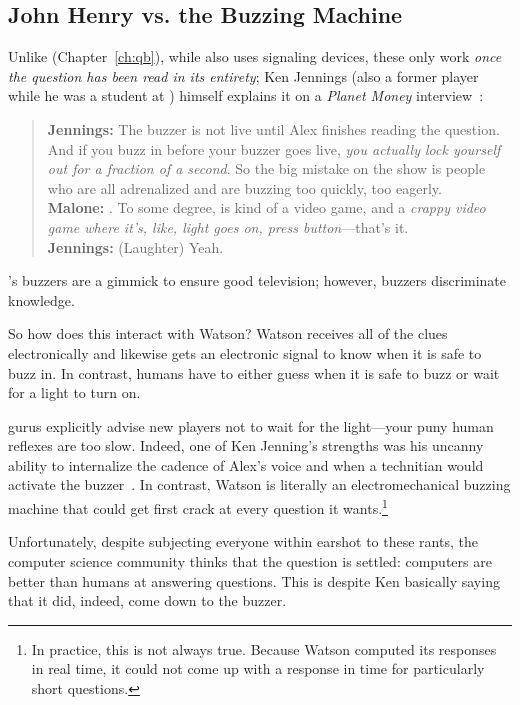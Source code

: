 \subsection{John Henry vs. the Buzzing Machine}

Unlike \qb{} (Chapter~\ref{ch:qb}), while \jeopardy{} also uses
signaling devices, these only work \emph{once the question has been
  read in its entirety}; Ken Jennings (also a former \qb{} player while he was a student at
) himself explains it on a \textit{Planet Money}
interview~\citep{malone-19}:
\begin{quote}
{\bf Jennings:} The buzzer is
    not live until Alex finishes reading the question. And if you buzz
    in before your buzzer goes live, \emph{you actually lock yourself out
    for a fraction of a second}. So the big mistake on the show is
    people who are all adrenalized and are buzzing too quickly, too
    eagerly. \\
{\bf Malone:} . To some degree, \jeopardy{} is kind of a video game, and a \emph{crappy video game where it's, like, light goes on, press button}---that's it. \\
{\bf Jennings:} (Laughter) Yeah. \\
\end{quote}
\jeopardy{}'s buzzers are a gimmick to ensure good television; however, \qb{} buzzers discriminate knowledge.

So how does this interact with Watson?
%
Watson receives all of the clues electronically and likewise gets an electronic signal to know when it is safe to buzz in.
%
In contrast, humans have to either guess when it is safe to buzz or
wait for a light to turn on.


\jeopardy{} gurus explicitly advise new players not to wait for the light---your puny human reflexes are too slow.
%
Indeed, one of Ken Jenning's strengths was his uncanny ability to
internalize the cadence of Alex's voice and when a technitian would
activate the buzzer~\citep{jennings-06}.
%
In contrast, Watson is literally an electromechanical buzzing machine
that could get first crack at every question it wants.\footnote{In
practice, this is not always true.  Because Watson computed its
responses in real time, it could not come up with a response in time
for particularly short questions.}

Unfortunately, despite subjecting everyone within earshot to these
rants, the computer science community thinks that the question is
settled: computers are better than humans at answering questions.
%
This is despite Ken basically saying that it did, indeed, come down to
the buzzer.

